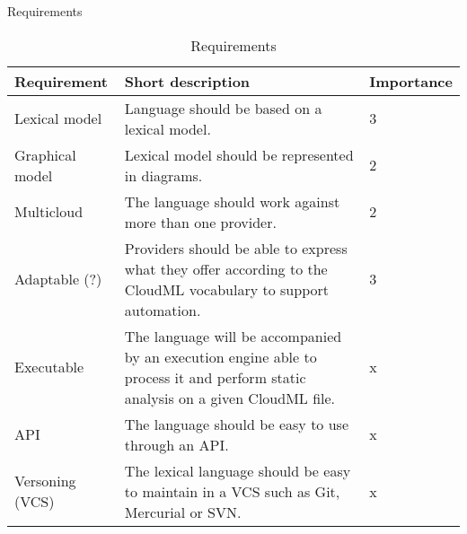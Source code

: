 \begin{table}
    \caption{Requirements}
    \begin{tabular}{ | l | p{7cm} | l | }
      \hline
      \textbf{Requirement} & \textbf{Short description} & \textbf{Importance} \\ \hline
      Lexical model & Language should be based on a lexical model. & 3 \\ \hline
      Graphical model & Lexical model should be represented in diagrams. & 2 \\ \hline
      Multicloud & The language should work against more than one provider. & 2 \\ \hline
      Adaptable (?) & Providers should be able to express what they offer according to the CloudML vocabulary to support automation. & 3 \\ \hline
      Executable & The language will be accompanied by an execution engine able to process it and perform static analysis on a given CloudML file. & x \\ \hline
      API & The language should be easy to use through an API. & x \\ \hline
      Versoning (VCS) & The lexical language should be easy to maintain in a VCS such as Git, Mercurial or SVN. & x \\ \hline
    \end{tabular}
  \caption{Requirements}
  \label{table:requirements}
\end{table}


